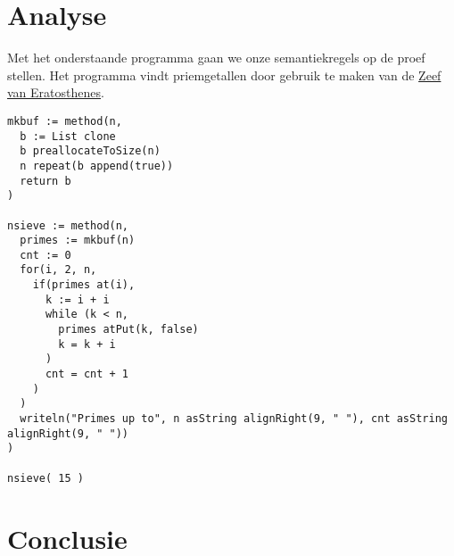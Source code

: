 \documentclass[12pt]{article}
\begin{document}
\pagebreak
\section{Analyse}
Met het onderstaande programma gaan we onze semantiekregels op de proef stellen.
Het programma vindt priemgetallen door gebruik te maken van de \href{https://nl.wikipedia.org/wiki/Zeef_van_Eratosthenes}{Zeef van Eratosthenes}.

\begin{lstlisting}[frame=single]
mkbuf := method(n,
  b := List clone
  b preallocateToSize(n)
  n repeat(b append(true))
  return b
)

nsieve := method(n,
  primes := mkbuf(n)
  cnt := 0
  for(i, 2, n,
    if(primes at(i),
      k := i + i
      while (k < n,
        primes atPut(k, false)
        k = k + i
      )
      cnt = cnt + 1
    )
  )
  writeln("Primes up to", n asString alignRight(9, " "), cnt asString alignRight(9, " "))
)

nsieve( 15 )

\end{lstlisting}

\pagebreak
\section{Conclusie}

\appendix
\end{document}
